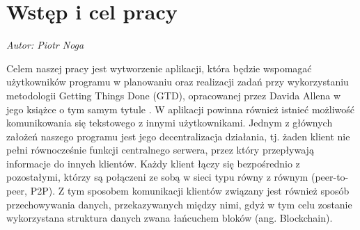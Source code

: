 \chapter{Wstęp i cel pracy}
\label{chap:wstep}
\textit{Autor: Piotr Noga}
\par Celem naszej pracy jest wytworzenie aplikacji, która będzie wspomagać użytkowników programu w planowaniu oraz realizacji zadań przy wykorzystaniu metodologii Getting Things Done (GTD), opracowanej przez Davida Allena w jego książce o tym samym tytule \cite{GTD}. W aplikacji powinna również istnieć możliwość komunikowania się tekstowego z innymi użytkownikami. Jednym z głównych założeń naszego programu jest jego decentralizacja działania, tj. żaden klient nie pełni równocześnie funkcji centralnego serwera, przez który przepływają informacje do innych klientów. Każdy klient łączy się bezpośrednio z pozostałymi, którzy są połączeni ze sobą w sieci typu równy z równym (peer-to-peer, P2P). Z tym sposobem komunikacji klientów związany jest również sposób przechowywania danych, przekazywanych między nimi, gdyż w tym celu zostanie wykorzystana struktura danych zwana łańcuchem bloków (ang. Blockchain).

